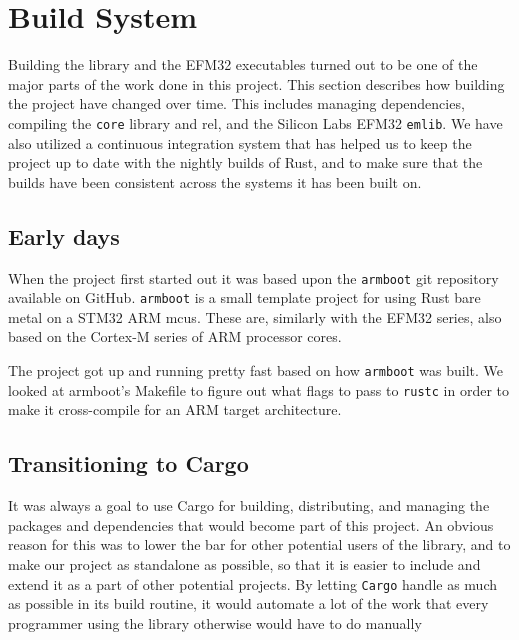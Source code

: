 \section{Build System}
\label{sec:build_system}

Building the library and the EFM32 executables turned out to be one of the major parts of the work done in this project.
This section describes how building the project have changed over time.
This includes managing dependencies, compiling the \texttt{core} library and \gls{rel}, and the Silicon Labs EFM32 \texttt{emlib}.
We have also utilized a continuous integration system that has helped us to keep the project up to date with the nightly builds of Rust, and to make sure that the builds have been consistent across the systems it has been built on.

\subsection{Early days}
\label{ssub:using_make}

When the project first started out it was based upon the \texttt{armboot} \cite{github:armboot} git repository available on GitHub.
\texttt{armboot} is a small template project for using Rust bare metal on a STM32 ARM \glspl{mcu}.
These are, similarly with the EFM32 series, also based on the Cortex-M series of ARM processor cores.

The project got up and running pretty fast based on how \texttt{armboot} was built.
We looked at armboot's Makefile to figure out what flags to pass to \texttt{rustc} in order to make it cross-compile for an ARM target architecture.

\subsection{Transitioning to Cargo}
\label{ssub:transitioning_to_cargo}

It was always a goal to use Cargo for building, distributing, and managing the packages and dependencies that would become part of this project.
An obvious reason for this was to lower the bar for other potential users of the library, and to make our project as standalone as possible, so that it is easier to include and extend it as a part of other potential projects.
By letting \texttt{Cargo} handle as much as possible in its build routine, it would automate a lot of the work that every programmer using the library otherwise would have to do manually

